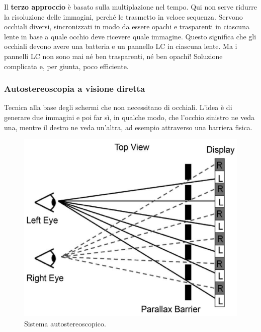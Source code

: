 \documentclass[a4paper,11pt]{article}
\begin{document}
Il \textbf{terzo approccio} è basato sulla multiplazione nel tempo. Qui non serve ridurre la risoluzione delle immagini, perché le trasmetto in
veloce sequenza. Servono occhiali diversi, sincronizzati in modo da essere opachi e trasparenti in ciascuna lente in base a quale occhio deve ricevere
quale immagine. Questo significa che gli occhiali devono avere una batteria e un pannello LC in ciascuna lente. Ma i pannelli LC
non sono mai né ben trasparenti, né ben opachi! Soluzione complicata e, per giunta, poco efficiente.

\subsubsection{Autostereoscopia a visione diretta}
Tecnica alla base degli schermi che non necessitano di occhiali. L'idea è di generare due immagini e poi far sì, in qualche modo, che l'occhio sinistro
ne veda una, mentre il destro ne veda un'altra, ad esempio attraverso una barriera fisica.

\renewcommand{\thefigure}{4.30}
\begin{figure}[!h]
  \centering
    \includegraphics[scale=0.35]{images/4/autostereoscopic.png}
    \caption{Sistema autostereoscopico.}
\end{figure}
\end{document}
